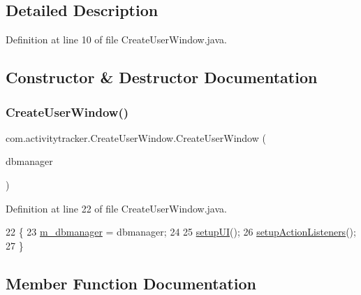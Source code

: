 \subsection{Detailed Description}


Definition at line 10 of file Create\+User\+Window.\+java.



\subsection{Constructor \& Destructor Documentation}
\mbox{\label{classcom_1_1activitytracker_1_1_create_user_window_a98ea46c069948eaf857173a0d93f64bb}} 
\subsubsection{\texorpdfstring{Create\+User\+Window()}{CreateUserWindow()}}
{\footnotesize\ttfamily com.\+activitytracker.\+Create\+User\+Window.\+Create\+User\+Window (\begin{DoxyParamCaption}\item[{\mbox{\hyperlink{classcom_1_1activitytracker_1_1_d_b_manager}{D\+B\+Manager}}}]{dbmanager }\end{DoxyParamCaption})\hspace{0.3cm}{\ttfamily [package]}}



Definition at line 22 of file Create\+User\+Window.\+java.


\begin{DoxyCode}
22                                           \{
23         \mbox{\hyperlink{classcom_1_1activitytracker_1_1_create_user_window_adab0a80c7975dfad1c2882a56f00a235}{m\_dbmanager}} = dbmanager;
24 
25         \mbox{\hyperlink{classcom_1_1activitytracker_1_1_create_user_window_a41715d85194c6bb84cf6969f771940dc}{setupUI}}();
26         \mbox{\hyperlink{classcom_1_1activitytracker_1_1_create_user_window_a174a05a389ca6f3b7979ac9c5028a3ae}{setupActionListeners}}();
27     \}
\end{DoxyCode}


\subsection{Member Function Documentation}
\mbox{\label{classcom_1_1activitytracker_1_1_create_user_window_a862f018ae96eb5df7529ff1beb312ff1}} 
